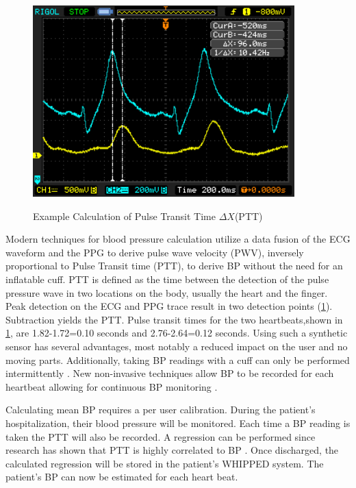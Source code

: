 \begin{figure}
	\begin{center}
		\label{fig:PTT_calc}
		\includegraphics[scale=1,width=0.9\textwidth]{Images/PTT_Calculation.png} 
		\caption{Example Calculation of Pulse Transit Time $ \Delta X $(PTT)}
	\end{center}
\end{figure}

Modern techniques for blood pressure calculation utilize a data fusion of the ECG waveform and the PPG to derive pulse wave velocity (PWV), inversely proportional to Pulse Transit time (PTT), to derive BP without the need for an inflatable cuff.  PTT is defined as the time between the detection of the pulse pressure wave in two locations on the body, usually the heart and the finger. Peak detection on the ECG and PPG trace result in two detection points (\cref{fig:PTT_calc}). Subtraction yields the PTT. Pulse transit times for the two heartbeats,shown in \cref{fig:PTT_calc}, are 1.82-1.72=0.10 seconds and 2.76-2.64=0.12 seconds. Using such a synthetic sensor has several advantages, most notably a reduced impact on the user and no moving parts. Additionally, taking BP readings with a cuff can only be performed intermittently \cite{DeMey1995}. New non-invasive techniques allow BP to be recorded for each heartbeat allowing for continuous BP monitoring \cite{Gesche2012}. 

Calculating mean BP requires a per user calibration. During the patient's hospitalization, their blood pressure will be monitored. Each time a BP reading is taken the PTT will also be recorded. A regression can be performed since research has shown that PTT is highly correlated to BP \cite{Chan2001}. Once discharged, the calculated regression will be stored in the patient's WHIPPED system. The patient's BP can now be estimated for each heart beat.  

